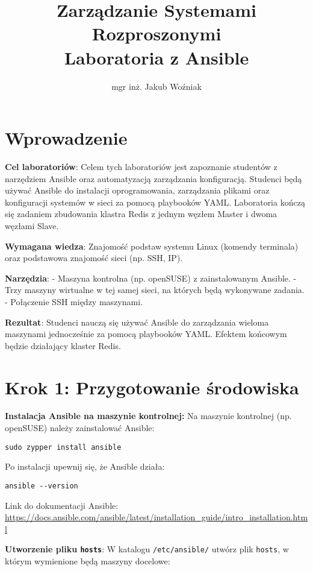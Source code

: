 \documentclass{article}
\title{Zarządzanie Systemami Rozproszonymi\\Laboratoria z Ansible}
\author{mgr inż. Jakub Woźniak}
\date{}
\begin{document}
\maketitle

\section*{Wprowadzenie}

\textbf{Cel laboratoriów}:  
Celem tych laboratoriów jest zapoznanie studentów z narzędziem Ansible oraz automatyzacją zarządzania konfiguracją. Studenci będą używać Ansible do instalacji oprogramowania, zarządzania plikami oraz konfiguracji systemów w sieci za pomocą playbooków YAML. Laboratoria kończą się zadaniem zbudowania klastra Redis z jednym węzłem Master i dwoma węzłami Slave.

\textbf{Wymagana wiedza}:  
Znajomość podstaw systemu Linux (komendy terminala) oraz podstawowa znajomość sieci (np. SSH, IP).

\textbf{Narzędzia}:  
- Maszyna kontrolna (np. openSUSE) z zainstalowanym Ansible.
- Trzy maszyny wirtualne w tej samej sieci, na których będą wykonywane zadania.
- Połączenie SSH między maszynami.

\textbf{Rezultat}:  
Studenci nauczą się używać Ansible do zarządzania wieloma maszynami jednocześnie za pomocą playbooków YAML. Efektem końcowym będzie działający klaster Redis.

\section{Krok 1: Przygotowanie środowiska}

\textbf{Instalacja Ansible na maszynie kontrolnej:}  
Na maszynie kontrolnej (np. openSUSE) należy zainstalować Ansible:

\begin{lstlisting}
sudo zypper install ansible
\end{lstlisting}

Po instalacji upewnij się, że Ansible działa:

\begin{lstlisting}
ansible --version
\end{lstlisting}

Link do dokumentacji Ansible:  
\url{https://docs.ansible.com/ansible/latest/installation_guide/intro_installation.html}

\textbf{Utworzenie pliku \texttt{hosts}}:  
W katalogu \texttt{/etc/ansible/} utwórz plik \texttt{hosts}, w którym wymienione będą maszyny docelowe:
\end{document}
